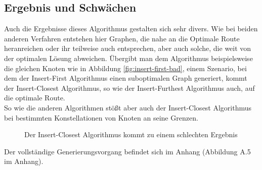 \subsection{Ergebnis und Schwächen}
Auch die Ergebnisse dieses Algorithmus gestalten sich sehr divers.
Wie bei beiden anderen Verfahren entstehen hier Graphen, die nahe an die Optimale Route heranreichen oder ihr teilweise auch entsprechen, aber auch solche, die weit von der optimalen Lösung abweichen.
Übergibt man dem Algorithmus beispielsweise die gleichen Knoten wie in Abbildung \vref{fig:insert-first-bad}, einem Szenario, bei dem der Insert-First Algorithmus einen suboptimalen Graph generiert, kommt der Insert-Closest Algorithmus, so wie der Insert-Furthest Algorithmus auch, auf die optimale Route.\\
So wie die anderen Algorithmen stößt aber auch der Insert-Closest Algorithmus bei bestimmten Konstellationen von Knoten an seine Grenzen.

\begin{figure}[H]
    \begin{center}
        \hfil
        \caption{Der Insert-Closest Algorithmus kommt zu einem schlechten Ergebnis}
        \label{fig:insert-closest-BAD}
    \end{center}
\end{figure}
Der vollständige Generierungsvorgang befindet sich im Anhang (Abbildung A.5 im Anhang). \\

